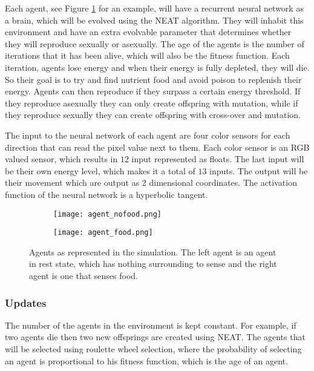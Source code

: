 Each agent, see Figure \ref{fig:agent} for an example, will have a recurrent neural network as a brain, which will be evolved using the NEAT algorithm.
They will inhabit this environment and have an extra evolvable parameter that determines whether they will reproduce sexually or asexually. 
The age of the agents is the number of iterations that it has been alive, which will also be the fitness function.
Each iteration, agents lose energy and when their energy is fully depleted, they will die.
So their goal is to try and find nutrient food and avoid poison to replenish their energy.
Agents can then reproduce if they surpass a certain energy threshold.
If they reproduce asexually they can only create offspring with mutation, while if they reproduce sexually they can create offspring with cross-over and mutation. 

The input to the neural network of each agent are four color sensors for each direction that can read the pixel value next to them.
Each color sensor is an RGB valued sensor, which results in $12$ input represented as floats.
The last input will be their own energy level, which makes it a total of $13$ inputs.
The output will be their movement which are output as 2 dimensional coordinates.
The activation function of the neural network is a hyperbolic tangent. 

\begin{figure}[H]
\begin{subfigure}[b]{0.5\linewidth}
    \centering
    \texttt{[image: agent\_nofood.png]}
\end{subfigure}%
\begin{subfigure}[b]{0.5\linewidth}
    \centering
    \texttt{[image: agent\_food.png]}
\end{subfigure}
\caption{Agents as represented in the simulation. The left agent is an agent in rest state, which has nothing surrounding to sense and the right agent is one that senses food.}
\label{fig:agent}
\end{figure}

\subsubsection{Updates}

The number of the agents in the environment is kept constant.
For example, if two agents die then two new offsprings are created using NEAT.
The agents that will be selected using roulette wheel selection, where the probability of selecting an agent is proportional to his fitness function, which is the age of an agent.

